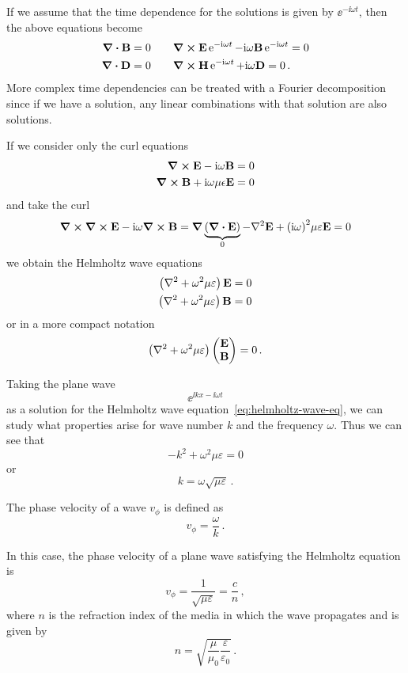\documentclass[12pt, class=report, crop=false]{standalone}
\begin{document}
If we assume that the time dependence for the solutions is given by
\(\ee^{-\ii \omega t}\), then the above equations become
\begin{subequations}
  \begin{align*}
    \div{\vb{B}} &= 0  \qquad \curl{\vb{E}}\operatorname{e}^{-\mathrm{i} \omega t} - \mathrm{i} \omega \vb{B} \operatorname{e}^{-\mathrm{i} \omega t} = 0 \\
    \div{\vb{D}} &= 0  \qquad \curl{\vb{H}}\operatorname{e}^{-\mathrm{i} \omega t} + \mathrm{i} \omega \vb{D} = 0\,.
  \end{align*}
\end{subequations}
More complex time dependencies can be treated with a Fourier decomposition since if we have a solution, any linear combinations
with that solution are also solutions.

If we consider only the curl equations
\[
\begin{aligned}
  \curl{\vb{E}} - \mathrm{i} \omega \vb{B} = 0 \\
  \curl{\vb{B}} + \mathrm{i} \omega \mu \epsilon \vb{E} = 0
\end{aligned}
\]
and take the curl
\[
\curl{\curl{\vb{E}}} - \ii \omega \curl{\vb{B}} = \grad{\underbrace{(\div{\vb{E}})}_{0}}
- \laplacian{\vb{E}} + {(\ii \omega)}^2 \mu \varepsilon \vb{E} = 0
\]
we obtain the Helmholtz wave equations
\[
\begin{aligned}
  \left(\laplacian + \omega^2 \mu \varepsilon \right)\vb{E} &= 0 \\
  \left(\laplacian + \omega^2 \mu \varepsilon \right)\vb{B} &= 0
\end{aligned}
\]
or in a more compact notation
\begin{equation*}
\label{eq:helmholtz-wave-eq}
\left(\laplacian + \omega^2 \mu \varepsilon \right)
\begin{pmatrix}
  \vb{E} \\ \vb{B}
\end{pmatrix}
= 0\,.
\end{equation*}

Taking the plane wave
\[
\ee^{\ii k x - \ii \omega t}
\]
as a solution for the Helmholtz wave equation~\eqref{eq:helmholtz-wave-eq}, we can study
what properties arise for wave number \(k\) and the frequency \(\omega\).
Thus we can see that
\[
-k^2 + \omega^2 \mu \varepsilon = 0
\]
or
\[
k = \omega \sqrt{\mu \varepsilon}\,.
\]

The phase velocity of a wave \(v_\phi\) is defined as
\[
v_\phi = \frac{\omega}{k}\,.
\]

In this case, the phase velocity of a plane wave satisfying the
Helmholtz equation is
\[
v_\phi = \frac{1}{\sqrt{\mu\varepsilon}} = \frac{c}{n}\,,
\]
where \(n\) is the refraction index of the media in which the wave propagates and is given by
\[
n = \sqrt{\frac{\mu}{\mu_0}\frac{\varepsilon}{\varepsilon_0}}\,.
\]
\end{document}
